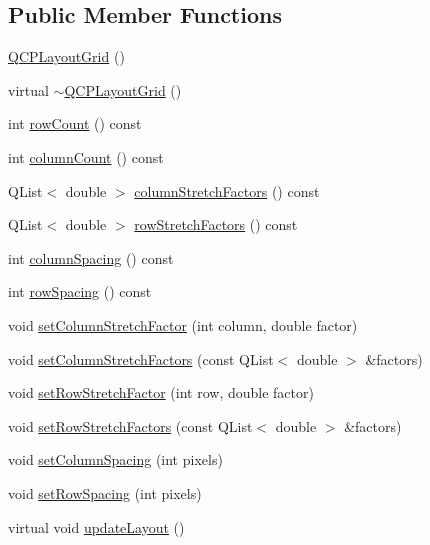 \subsection*{Public Member Functions}
\begin{DoxyCompactItemize}
\item 
\hyperlink{classQCPLayoutGrid_ab2a4c1587dc8aed4c41c509c8d8d2a64}{Q\+C\+P\+Layout\+Grid} ()
\item 
virtual \hyperlink{classQCPLayoutGrid_af859f4a4db693a21056a9e615f6c4a90}{$\sim$\+Q\+C\+P\+Layout\+Grid} ()
\item 
int \hyperlink{classQCPLayoutGrid_af8e6c7a05864ebe610c87756c7b9079c}{row\+Count} () const 
\item 
int \hyperlink{classQCPLayoutGrid_ac39074eafd148b82d0762090f258189e}{column\+Count} () const 
\item 
Q\+List$<$ double $>$ \hyperlink{classQCPLayoutGrid_a39bd7994d00687d1b9defef6f1bda835}{column\+Stretch\+Factors} () const 
\item 
Q\+List$<$ double $>$ \hyperlink{classQCPLayoutGrid_a3744496abf73c8e3b464181d63bb20a7}{row\+Stretch\+Factors} () const 
\item 
int \hyperlink{classQCPLayoutGrid_a3de19753fdca81194458cb15156f7315}{column\+Spacing} () const 
\item 
int \hyperlink{classQCPLayoutGrid_abccdd33c1b284feb6df90fa02f23d9a3}{row\+Spacing} () const 
\item 
void \hyperlink{classQCPLayoutGrid_ae38f31a71687b9d7ee3104852528fb50}{set\+Column\+Stretch\+Factor} (int column, double factor)
\item 
void \hyperlink{classQCPLayoutGrid_a6c2591d1a7e2534ce036989543b49e57}{set\+Column\+Stretch\+Factors} (const Q\+List$<$ double $>$ \&factors)
\item 
void \hyperlink{classQCPLayoutGrid_a7b0273de5369bd93d942edbaf5b166ec}{set\+Row\+Stretch\+Factor} (int row, double factor)
\item 
void \hyperlink{classQCPLayoutGrid_a200b45f9c908f96ebadaa3c8d87a2782}{set\+Row\+Stretch\+Factors} (const Q\+List$<$ double $>$ \&factors)
\item 
void \hyperlink{classQCPLayoutGrid_a3a49272aba32bb0fddc3bb2a45a3dba0}{set\+Column\+Spacing} (int pixels)
\item 
void \hyperlink{classQCPLayoutGrid_aaef2cd2d456197ee06a208793678e436}{set\+Row\+Spacing} (int pixels)
\item 
virtual void \hyperlink{classQCPLayoutGrid_a07f8dd7d3d61d7345026621d446042a4}{update\+Layout} ()

\end{DoxyCompactItemize}
